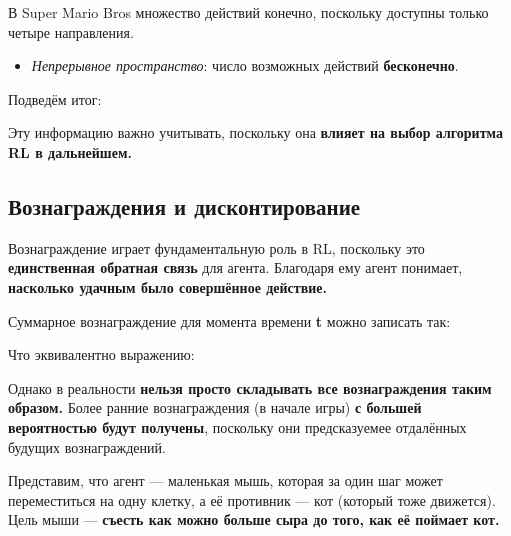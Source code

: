 \documentclass[11pt,a4paper]{article}
\begin{document}

В Super Mario Bros множество действий конечно, поскольку доступны только четыре направления.

\begin{itemize}
\tightlist
\item
  \emph{Непрерывное пространство}: число возможных действий \textbf{бесконечно}.
\end{itemize}


Подведём итог:


Эту информацию важно учитывать, поскольку она \textbf{влияет на выбор алгоритма RL в дальнейшем.}

\subsection{Вознаграждения и дисконтирование}\label{rewards-and-the-discounting}

Вознаграждение играет фундаментальную роль в RL, поскольку это \textbf{единственная обратная связь} для агента. Благодаря ему агент понимает, \textbf{насколько удачным было совершённое действие.}

Суммарное вознаграждение для момента времени \textbf{t} можно записать так:


Что эквивалентно выражению:


Однако в реальности \textbf{нельзя просто складывать все вознаграждения таким образом.} Более ранние вознаграждения (в начале игры) \textbf{с большей вероятностью будут получены}, поскольку они предсказуемее отдалённых будущих вознаграждений.

Представим, что агент --- маленькая мышь, которая за один шаг может переместиться на одну клетку, а её противник --- кот (который тоже движется). Цель мыши --- \textbf{съесть как можно больше сыра до того, как её поймает кот.}
\end{document}
